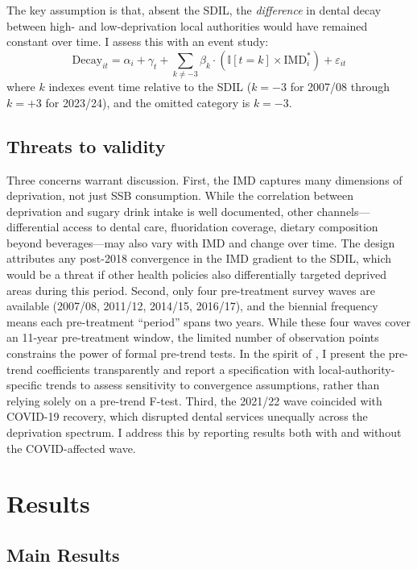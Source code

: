 \documentclass[12pt]{article}
\newcommand{\ind}{\mathbb{I}}
\begin{document}
The key assumption is that, absent the SDIL, the \textit{difference} in dental decay between high- and low-deprivation local authorities would have remained constant over time. I assess this with an event study:
\begin{equation}
\text{Decay}_{it} = \alpha_i + \gamma_t + \sum_{k \neq -3} \beta_k \cdot (\ind[t = k] \times \text{IMD}_i^*) + \varepsilon_{it}
\label{eq:event}
\end{equation}
where $k$ indexes event time relative to the SDIL ($k = -3$ for 2007/08 through $k = +3$ for 2023/24), and the omitted category is $k = -3$.

\subsection{Threats to validity}

Three concerns warrant discussion. First, the IMD captures many dimensions of deprivation, not just SSB consumption. While the correlation between deprivation and sugary drink intake is well documented, other channels---differential access to dental care, fluoridation coverage, dietary composition beyond beverages---may also vary with IMD and change over time. The design attributes any post-2018 convergence in the IMD gradient to the SDIL, which would be a threat if other health policies also differentially targeted deprived areas during this period. Second, only four pre-treatment survey waves are available (2007/08, 2011/12, 2014/15, 2016/17), and the biennial frequency means each pre-treatment ``period'' spans two years. While these four waves cover an 11-year pre-treatment window, the limited number of observation points constrains the power of formal pre-trend tests. In the spirit of \citet{rambachan2023honest}, I present the pre-trend coefficients transparently and report a specification with local-authority-specific trends to assess sensitivity to convergence assumptions, rather than relying solely on a pre-trend F-test. Third, the 2021/22 wave coincided with COVID-19 recovery, which disrupted dental services unequally across the deprivation spectrum. I address this by reporting results both with and without the COVID-affected wave.


\section{Results}

\subsection{Main Results}
\end{document}
